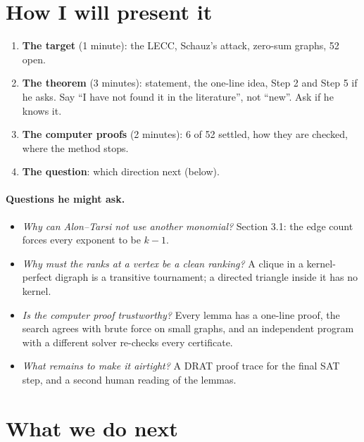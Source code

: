 \documentclass[11pt]{article}
\theoremstyle{plain}
\theoremstyle{definition}
\begin{document}
\section{How I will present it}

\begin{enumerate}[leftmargin=*]
  \item \textbf{The target} (1 minute): the LECC, Schauz's attack, zero-sum graphs, 52 open.
  \item \textbf{The theorem} (3 minutes): statement, the one-line idea, Step 2 and Step 5 if he
        asks. Say ``I have not found it in the literature'', not ``new''. Ask if he knows it.
  \item \textbf{The computer proofs} (2 minutes): 6 of 52 settled, how they are checked, where
        the method stops.
  \item \textbf{The question}: which direction next (below).
\end{enumerate}

\paragraph{Questions he might ask.}
\begin{itemize}[leftmargin=*]
  \item \emph{Why can Alon--Tarsi not use another monomial?} Section 3.1: the edge count forces
        every exponent to be $k-1$.
  \item \emph{Why must the ranks at a vertex be a clean ranking?} A clique in a kernel-perfect
        digraph is a transitive tournament; a directed triangle inside it has no kernel.
  \item \emph{Is the computer proof trustworthy?} Every lemma has a one-line proof, the search
        agrees with brute force on small graphs, and an independent program with a different
        solver re-checks every certificate.
  \item \emph{What remains to make it airtight?} A DRAT proof trace for the final SAT step, and
        a second human reading of the lemmas.
\end{itemize}

\section{What we do next}
\end{document}
